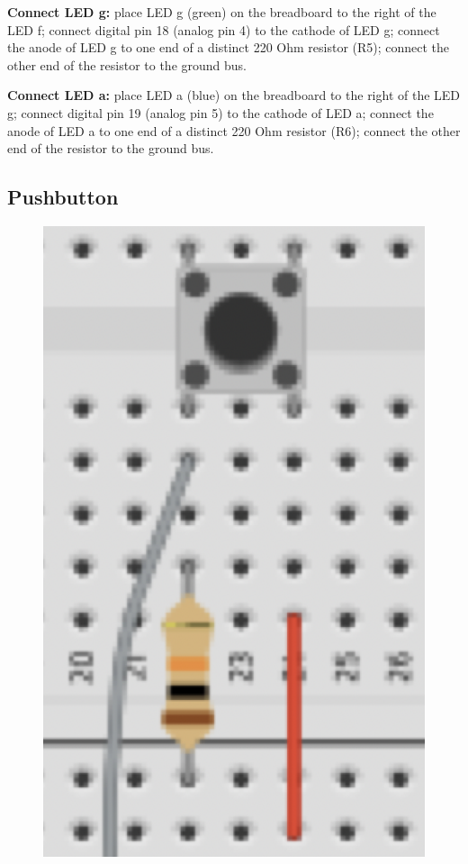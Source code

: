 \documentclass[a4paper]{article}
\begin{document}
\noindent \textbf{Connect LED g:} place LED g (green) on the breadboard to the right of the LED f; connect digital pin 18 (analog pin 4) to the cathode of LED g; connect the anode of LED g to one end of a distinct 220 Ohm resistor (R5); connect the other end of the resistor to the ground bus.

\noindent \textbf{Connect LED a:} place LED a (blue) on the breadboard to the right of the LED g; connect digital pin 19 (analog pin 5) to the cathode of LED a; connect the anode of LED a to one end of a distinct 220 Ohm resistor (R6); connect the other end of the resistor to the ground bus.

\subsection{Pushbutton}

\begin{figure}
  \vspace{-50pt}
  \begin{center}
    \includegraphics[width=1.1\linewidth]{pushbutton.png}
  \end{center}
\vspace{-25pt}
\end{figure}
\end{document}
